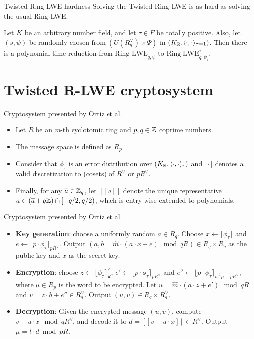 \documentclass[notheorems, bigger]{beamer}
\begin{document}
\begin{frame}[label={sec:org1f43afa}]{Twisted Ring-LWE hardness}
Solving the Twisted Ring-LWE is as hard as solving the usual Ring-LWE.
\begin{theorem}
  \label{theorem:twisted-ring-lwe-hardness}
  Let $K$ be an arbitrary number field, and let $\tau \in F$ be totally positive.
  Also, let $(s,\psi)$ be randomly chosen from $(U(R_q^\vee)\times \Psi)$ in $(K_{\mathbb{R}},\langle{\cdot,\cdot}\rangle_{\tau=1})$.
  Then there is a polynomial-time reduction from $\mbox{Ring-LWE}_{q,\psi}$ to $\mbox{Ring-LWE}^\tau_{q,\psi_\tau}$.
\end{theorem}
\end{frame}
\section{Twisted R-LWE cryptosystem}
\label{sec:orgfd8af9e}
\begin{frame}[label={sec:orgdb082a2}]{Cryptosystem presented by Ortiz et al.}
\begin{itemize}
\item Let \(R\) be an \emph{m}-th cyclotomic ring and \(p, q \in \mathbb{Z}\) coprime numbers.
\item The message space is defined as \(R_p\).
\item Consider that \(\phi_\tau\) is an error distribution over \((K_{\mathbb{R}},\langle{\cdot,\cdot}\rangle_\tau)\) and \(\lfloor{\cdot}\rceil\) denotes a valid discretization to (cosets) of \(R^\vee\) or \(pR^\vee\).
\item Finally, for any \(\overline{a} \in \mathbb{Z}_q\), let \([[\overline{a}]]\) denote the unique representative \(a \in (\overline{a} + q\mathbb{Z}) \cap [-q/2, q/2)\), which is entry-wise extended to polynomials.
\end{itemize}
\end{frame}
\begin{frame}[label={sec:orgcd05ce3}]{Cryptosystem presented by Ortiz et al.}
 \begin{itemize}
\item \textbf{Key generation}: choose a uniformly random $a \in R_q$. Choose $x
  \longleftarrow \lfloor{\phi_\tau}\rceil$ and $e \longleftarrow \lfloor{p \cdot \phi_\tau}\rceil_{pR^\vee}$. Output $(a,b = \hat{m}\cdot(a \cdot x + e)
  \mod{qR} ) \in R_q \times R_q$ as the public key and $x$ as the secret key.
\item \textbf{Encryption}: choose $z \longleftarrow  \lfloor{\phi_\tau}\rceil_R^\vee$, $e' \longleftarrow \lfloor{p \cdot
    \phi_\tau}\rceil_{pR^\vee}$ and  $e'' \longleftarrow \lfloor{p \cdot \phi_\tau}\rceil_{t^{-1}\mu +pR^\vee}$, where $\mu \in R_p$ is
  the word to be encrypted. Let $u = \hat{m} \cdot (a \cdot z + e') \mod{qR}$ and $v =
  z \cdot b + e'' \in R_q^\vee$. Output $(u,v) \in R_q \times R^\vee_q$.
\item \textbf{Decryption}: Given the encrypted message $(u,v)$, compute $v - u
  \cdot x \mod{qR^\vee}$, and decode it to $d = [[v - u \cdot x]] \in R^\vee$. Output $\mu = t \cdot
  d \bmod{pR}$. 
\end{itemize}
\end{frame}
\end{document}
